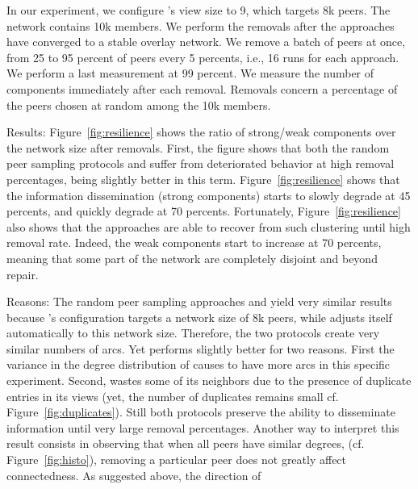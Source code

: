 \begin{asparadesc}
  In our experiment, we configure \CYCLON's view size to 9, which
  targets 8k peers. The network contains 10k members. We perform the
  removals after the approaches have converged to a stable overlay
  network. We remove a batch of peers at once, from 25 to 95 percent
  of peers every 5 percents, i.e., 16 runs for each approach. We
  perform a last measurement at 99 percent. We measure the number of
  components immediately after each removal. Removals concern a
  percentage of the peers chosen at random among the 10k members.
\item[Results:] Figure~\ref{fig:resilience} shows the ratio of strong/weak
  components over the network size after removals. First, the figure shows that
  both the random peer sampling protocols \SPRAY and \CYCLON suffer from
  deteriorated behavior at high removal percentages, \CYCLON being slightly
  better in this term. Figure~\ref{fig:resilience} shows that the information
  dissemination (strong components) starts to slowly degrade at 45 percents, and
  quickly degrade at 70 percents. Fortunately, Figure~\ref{fig:resilience} also
  shows that the approaches are able to recover from such clustering until high
  removal rate. Indeed, the weak components start to increase at 70 percents,
  meaning that some part of the network are completely disjoint and beyond
  repair.%
\item[Reasons:] The random peer sampling approaches \CYCLON and \SPRAY
  yield very similar results because \CYCLON's configuration targets a
  network size of 8k peers, while \SPRAY adjusts itself automatically
  to this network size.  Therefore, the two protocols create very
  similar numbers of arcs. Yet \CYCLON performs slightly better for
  two reasons. First the variance in the degree distribution of \SPRAY
  causes \CYCLON to have more arcs in this specific
  experiment. Second, \SPRAY wastes some of its neighbors due to the
  presence of duplicate entries in its views (yet, the number of
  duplicates remains small cf. Figure~\ref{fig:duplicates}). Still
  both protocols preserve the ability to disseminate information until
  very large removal percentages. Another way to interpret this result
  consists in observing that when all peers have similar degrees,
  (cf. Figure~\ref{fig:histo}), removing a particular peer does not
  greatly affect connectedness. As suggested above, the direction of

\end{asparadesc}

